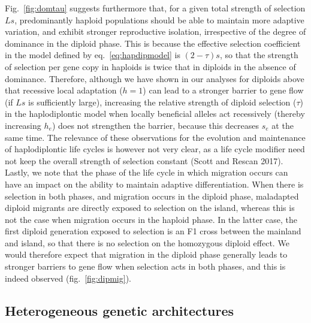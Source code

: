 \documentclass[
  11pt,
]{article}
\begin{document}
Fig.~\ref{fig:domtau} suggests furthermore that, for a given total
strength of selection \(Ls\), predominantly haploid populations should
be able to maintain more adaptive variation, and exhibit stronger
reproductive isolation, irrespective of the degree of dominance in the
diploid phase. This is because the effective selection coefficient in
the model defined by eq.~\ref{eq:hapdipmodel} is \((2-\tau)s\), so that
the strength of selection per gene copy in haploids is twice that in
diploids in the absence of dominance. Therefore, although we have shown
in our analyses for diploids above that recessive local adaptation
(\(h=1\)) can lead to a stronger barrier to gene flow (if \(Ls\) is
sufficiently large), increasing the relative strength of diploid
selection (\(\tau\)) in the haplodiplontic model when locally beneficial
alleles act recessively (thereby increasing \(h_e\)) does not strengthen
the barrier, because this decreases \(s_e\) at the same time. The
relevance of these observations for the evolution and maintenance of
haplodiplontic life cycles is however not very clear, as a life cycle
modifier need not keep the overall strength of selection constant (Scott
and Rescan 2017). Lastly, we note that the phase of the life cycle in
which migration occurs can have an impact on the ability to maintain
adaptive differentiation. When there is selection in both phases, and
migration occurs in the diploid phase, maladapted diploid migrants are
directly exposed to selection on the island, whereas this is not the
case when migration occurs in the haploid phase. In the latter case, the
first diploid generation exposed to selection is an F1 cross between the
mainland and island, so that there is no selection on the homozygous
diploid effect. We would therefore expect that migration in the diploid
phase generally leads to stronger barriers to gene flow when selection
acts in both phases, and this is indeed observed
(fig.~\ref{fig:dipmig}).

\hypertarget{heterogeneous-genetic-architectures}{%
\subsection{Heterogeneous genetic
architectures}\label{heterogeneous-genetic-architectures}}
\end{document}
